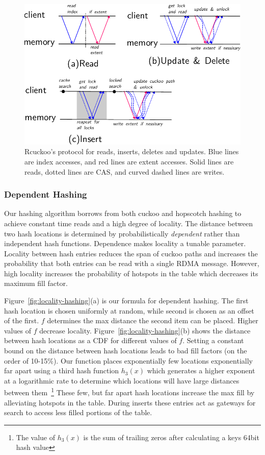 \begin{figure}[t]
\includegraphics[width=0.99\linewidth]{fig/message_diagram.pdf}
\caption{Rcuckoo's protocol for reads, inserts, deletes and
updates. Blue lines are index accesses, and red lines are
extent accesses. Solid lines are reads, dotted lines are
CAS, and curved dashed lines are writes.}
\label{fig:message_diagram}
\end{figure}

\subsubsection{Dependent Hashing}

Our hashing algorithm borrows from both cuckoo and hopscotch
hashing to achieve constant time reads and a high degree of
locality. The distance between two hash locations is
determined by probabilistically \textit{dependent} rather
than independent hash functions. Dependence makes locality a
tunable parameter. Locality between hash entries reduces the
span of cuckoo paths and increases the probability that both
entries can be read with a single RDMA message. However,
high locality increases the probability of hotspots in the
table which decreases its maximum fill factor.

Figure~\ref{fig:locality-hashing}(a) is our formula for dependent
hashing. The first hash location is chosen uniformly at
random, while second is chosen as an offset of the first.
$f$ determines the max distance the second item can be
placed. Higher values of $f$ decrease locality.
Figure~\ref{fig:locality-hashing}(b) shows the distance between hash
locations as a CDF for different values of $f$. Setting a
constant bound on the distance between hash locations leads
to bad fill factors (on the order of 10-15\%). Our function
places exponentially few locations exponentially far apart
using a third hash function $h_3(x)$ which generates a
higher exponent at a logarithmic rate to determine which
locations will have large distances between
them~\footnote{The value of $h_3(x)$ is the sum of trailing
zeros after calculating a keys 64bit hash value} These few,
but far apart hash locations increase the max fill by
alleviating hotspots in the table. During inserts these
entries act as gateways for search to access less filled
portions of the table. 

